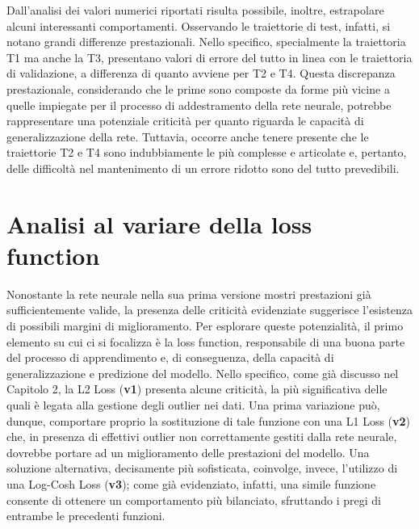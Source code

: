 Dall'analisi dei valori numerici riportati risulta possibile, inoltre, estrapolare alcuni interessanti comportamenti. Osservando le traiettorie di test, infatti, si notano grandi differenze prestazionali. Nello specifico, specialmente la traiettoria T1 ma anche la T3, presentano valori di errore del tutto in linea con le traiettoria di validazione, a differenza di quanto avviene per T2 e T4. Questa discrepanza prestazionale, considerando che le prime sono composte da forme più vicine a quelle impiegate per il processo di addestramento della rete neurale, potrebbe rappresentare una potenziale criticità per quanto riguarda le capacità di generalizzazione della rete. Tuttavia, occorre anche tenere presente che le traiettorie T2 e T4 sono indubbiamente le più complesse e articolate e, pertanto, delle difficoltà nel mantenimento di un errore ridotto sono del tutto prevedibili.



\section{Analisi al variare della loss function}

Nonostante la rete neurale nella sua prima versione mostri prestazioni già sufficientemente valide, la presenza delle criticità evidenziate suggerisce l'esistenza di possibili margini di miglioramento. Per esplorare queste potenzialità, il primo elemento su cui ci si focalizza è la loss function, responsabile di una buona parte del processo di apprendimento e, di conseguenza, della capacità di generalizzazione e predizione del modello. Nello specifico, come già discusso nel Capitolo 2, la L2 Loss (\textbf{v1}) presenta alcune criticità, la più significativa delle quali è legata alla gestione degli outlier nei dati. Una prima variazione può, dunque, comportare proprio la sostituzione di tale funzione con una L1 Loss (\textbf{v2}) che, in presenza di effettivi outlier non correttamente gestiti dalla rete neurale, dovrebbe portare ad un miglioramento delle prestazioni del modello. Una soluzione alternativa, decisamente più sofisticata, coinvolge, invece, l'utilizzo di una Log-Cosh Loss (\textbf{v3}); come già evidenziato, infatti, una simile funzione consente di ottenere un comportamento più bilanciato, sfruttando i pregi di entrambe le precedenti funzioni.



